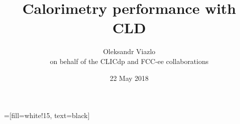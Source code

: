\documentclass[8pt]{beamer}
\newif\ifplacelogo %
\begin{document}
\newcommand{\myNode}{\tikz[baseline,inner sep=1pt] \node[anchor=base]}

 =[fill=white!15, text=black]



\title[Calorimetry performance with CLD \hspace{14.0em}\insertframenumber/
\inserttotalframenumber]{ Calorimetry performance with CLD }


	\author[Oleksandr Viazlo]{Oleksandr Viazlo\\ 
	{\small on behalf of the CLICdp and FCC-ee collaborations}
	}
	
       
	\date{22 May 2018}


	

   	

\placelogofalse
\end{document}
